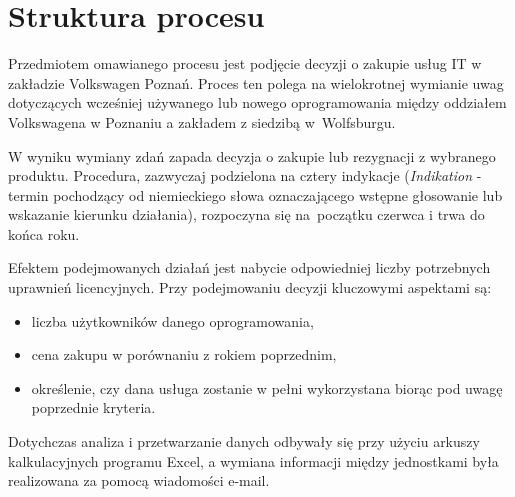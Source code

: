 \section{Struktura procesu}
Przedmiotem omawianego procesu jest podjęcie decyzji o zakupie usług IT w zakładzie Volkswagen Poznań. Proces ten polega na wielokrotnej wymianie uwag dotyczących wcześniej używanego lub nowego oprogramowania między oddziałem Volkswagena w Poznaniu a zakładem z siedzibą w~Wolfsburgu.

W wyniku wymiany zdań zapada decyzja o zakupie lub rezygnacji z wybranego produktu. Procedura, zazwyczaj podzielona na cztery indykacje (\emph{Indikation} - termin pochodzący od niemieckiego słowa oznaczającego wstępne głosowanie lub wskazanie kierunku działania), rozpoczyna się na~początku czerwca i trwa do końca roku.

Efektem podejmowanych działań jest nabycie odpowiedniej liczby potrzebnych uprawnień licencyjnych. Przy
podejmowaniu decyzji kluczowymi aspektami są:
\begin{itemize}
    \item liczba użytkowników danego oprogramowania,
    \item cena zakupu w porównaniu z rokiem poprzednim,
    \item określenie, czy dana usługa zostanie w pełni wykorzystana biorąc pod uwagę poprzednie kryteria.
\end{itemize}
Dotychczas analiza i przetwarzanie danych odbywały się przy użyciu arkuszy kalkulacyjnych programu Excel, a wymiana informacji między jednostkami była realizowana za pomocą wiadomości e-mail.